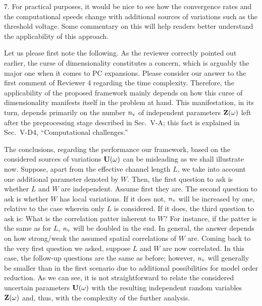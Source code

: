 \begin{reviewer}
7. For practical purposes, it would be nice to see how the convergence rates and the computational speeds change with additional sources of variations such as the threshold voltage. Some commentary on this will help readers better understand the applicability of this approach.
\end{reviewer}
\begin{authors}
Let us please first note the following.
As the reviewer correctly pointed out earlier, the curse of dimensionality constitutes a concern, which is arguably the major one when it comes to PC expansions.
Please consider our answer to the first comment of Reviewer 4 regarding the time complexity.
Therefore, the applicability of the proposed framework mainly depends on how this curse of dimensionality manifests itself in the problem at hand.
This manifestation, in its turn, depends primarily on the number ${n_\text{v}}$ of independent parameters $\mathbf{Z}(\omega)$ left after the preprocessing stage described in Sec.~V-A; this fact is explained in Sec.~V-D4, ``Computational challenges.''

The conclusions, regarding the performance our framework, based on the considered sources of variations $\mathbf{U}(\omega)$ can be misleading as we shall illustrate now.
Suppose, apart from the effective channel length $L$, we take into account one additional parameter denoted by $W$.
Then, the first question to ask is whether $L$ and $W$ are independent.
Assume first they are.
The second question to ask is whether $W$ has local variations.
If it does not, ${n_\text{v}}$ will be increased by one, relative to the case wherein only $L$ is considered.
If it does, the third question to ask is: What is the correlation patter inherent to $W$?
For instance, if the patter is the same as for $L$, ${n_\text{v}}$ will be doubled in the end.
In general, the answer depends on how strong/weak the assumed spatial correlations of $W$ are.
Coming back to the very first question we asked, suppose $L$ and $W$ are now correlated.
In this case, the follow-up questions are the same as before; however, ${n_\text{v}}$ will generally be smaller than in the first scenario due to additional possibilities for model order reduction.
As we can see, it is not straightforward to relate the considered uncertain parameters $\mathbf{U}(\omega)$ with the resulting independent random variables $\mathbf{Z}(\omega)$ and, thus, with the complexity of the further analysis.


\end{authors}
